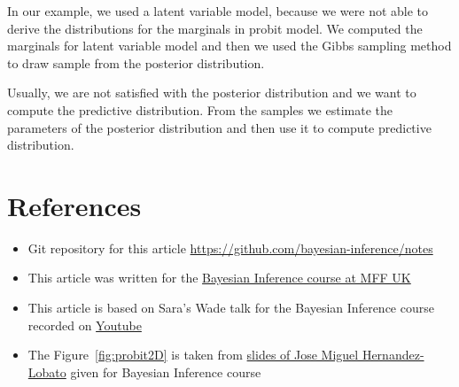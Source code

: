 In our example, we used a latent variable model, because we were not able to derive the distributions for the marginals in probit model. We computed the marginals for latent variable model and then we used the Gibbs sampling method to draw sample from the posterior distribution.

Usually, we are not satisfied with the posterior distribution and we want to compute the predictive distribution. From the samples we estimate the parameters of the posterior distribution and then use it to compute predictive distribution.





\section*{References}
\begin{itemize}
    \item Git repository for this article \url{https://github.com/bayesian-inference/notes}
    \item This article was written for the \href{https://sites.google.com/site/filipjurcicek/teaching/bayesian-inference}{Bayesian Inference course at MFF UK}
    \item This article is based on Sara's Wade talk for the Bayesian Inference course recorded on \href{http://youtu.be/rsUt9uV6j70?t=12m18s}{Youtube}
    \item The Figure~\ref{fig:probit2D} is taken from \href{https://sites.google.com/site/filipjurcicek/teaching/bayesian-inference/NPFL108-slidesLecture3.pdf?attredirects=0}{slides of Jose Miguel Hernandez-Lobato} given for Bayesian Inference course
\end{itemize}






